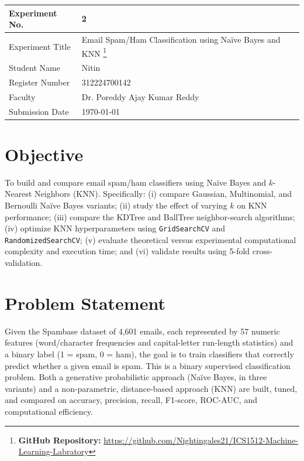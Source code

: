 \documentclass[12pt,a4paper]{article}
\DeclareRobustCommand{\_}{\textunderscore\allowbreak}
\begin{document}
\noindent\begin{tabular}{|p{4cm}|p{\dimexpr\linewidth-4cm-4\tabcolsep-3\arrayrulewidth\relax}|}
\hline
Experiment No. & 2 \\ \hline
Experiment Title & Email Spam/Ham Classification using Na\"ive Bayes and KNN
\footnote{\textbf{GitHub Repository: }\url{https://github.com/Nightingales21/ICS1512-Machine-Learning-Labratory}}\\ \hline
Student Name & Nitin \\ \hline
Register Number & 312224700142 \\ \hline
Faculty & Dr. Poreddy Ajay Kumar Reddy \\ \hline
Submission Date & \today \\ \hline
\end{tabular}

\section{Objective}
To build and compare email spam/ham classifiers using Na\"ive Bayes and
$k$-Nearest Neighbors (KNN). Specifically: (i) compare Gaussian, Multinomial,
and Bernoulli Na\"ive Bayes variants; (ii) study the effect of varying $k$ on
KNN performance; (iii) compare the KDTree and BallTree neighbor-search
algorithms; (iv) optimize KNN hyperparameters using \texttt{GridSearchCV} and
\texttt{RandomizedSearchCV}; (v) evaluate theoretical versus experimental
computational complexity and execution time; and (vi) validate results using
5-fold cross-validation.

\section{Problem Statement}
Given the Spambase dataset of 4{,}601 emails, each represented by 57
numeric features (word/character frequencies and capital-letter run-length
statistics) and a binary label (1 = spam, 0 = ham), the goal is to train
classifiers that correctly predict whether a given email is spam. This is a
binary supervised classification problem. Both a generative probabilistic
approach (Na\"ive Bayes, in three variants) and a non-parametric,
distance-based approach (KNN) are built, tuned, and compared on accuracy,
precision, recall, F1-score, ROC-AUC, and computational efficiency.
\end{document}
